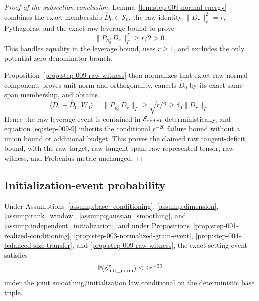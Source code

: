 \begin{proof}[Proof of the subsection conclusion]

Lemma~\ref{lem:step-009-normal-energy} combines the exact membership
\(\widehat D_0\in\mathscr S_0\), the raw identity
\(\|D_r\|_F^2=r\), Pythagoras, and the exact raw leverage bound to prove
\[
  \|P_{\mathscr S_0^\perp}D_r\|_F^2\ge r/2>0.
\]
This handles equality in the leverage bound, uses \(r\ge1\), and excludes the only
potential zero-denominator branch.

Proposition~\ref{prop:step-009-raw-witness} then normalizes that exact raw
normal component, proves unit norm and orthogonality, cancels
\(\widehat D_0\) by its exact same-span membership, and obtains
\[
  \langle D_r-\widehat D_0,W_0\rangle
  =\|P_{\mathscr S_0^\perp}D_r\|_F
  \ge\sqrt{r/2}
  \ge\delta_0\|D_r\|_F.
\]
Hence the raw leverage event is contained in
\(\mathcal E_{\rm deficit}\) deterministically,
and equation \eqref{eq:step-009-9} inherits the conditional \(r^{-20}\) failure bound
without a union bound or additional budget. This proves the claimed raw
tangent-deficit bound, with the raw target, raw tangent span, raw represented tensor, raw
witness, and Frobenius metric unchanged.

\end{proof}

\subsection{Initialization-event probability}\label{app:step-010}

\begin{proposition}
\label{prop:step-010-conditional-union}
Under Assumptions~\ref{assump:base_conditioning},
\ref{assump:dimension}, \ref{assump:rank_window},
\ref{assump:gaussian_smoothing}, and
\ref{assump:independent_initialization}, and under
Propositions~\ref{prop:step-001-realized-conditioning},
\ref{prop:step-003-normalized-gram-event},
\ref{prop:step-004-balanced-size-transfer}, and
\ref{prop:step-009-raw-witness}, the exact setting event satisfies
\[
  \mathbb P(\mathcal E_{\rm init\_norm}^{\mathsf c})\le4r^{-20}
\]
under the joint smoothing/initialization law conditional on the deterministic
base triple.

\end{proposition}

